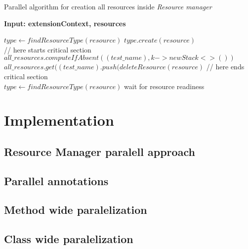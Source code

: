 \begin{algorithm}[H]
\label{01:alg:dsdsd}
\caption{Parallel algorithm for creation all resources inside \emph{Resource manager}}

\hspace*{\algorithmicindent} \textbf{Input: extensionContext, resources}

    \begin{algorithmic}[1]
            \State $type \gets findResourceType(resource)$
            \State $type.create(resource)$
            \\
            \State // here starts critical section
            \State $all\_resources.computeIfAbsent((test\_name), k -> new Stack<>())$
            \State $all\_resources.get((test\_name).push(deleteResource(resource)$
            \State // here ends critical section
            \\
                \State $type \gets findResourceType(resource)$
                \State wait for resource readiness
            \EndForEach
        \EndIf
        \EndForEach
    \end{algorithmic}
\end{algorithm}

\chapter{Implementation}

\section{Resource Manager paralell approach} %
\section{Parallel annotations}
\section{Method wide paralelization}
\section{Class wide paralelization}
